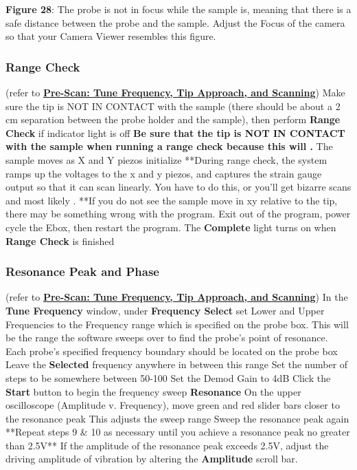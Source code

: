 \documentclass{../lab}
\begin{document}
\textbf{Figure 28}:  The probe is not in focus while the sample is, meaning that there is a safe distance between the probe and the sample.  Adjust the Focus of the camera so that your Camera Viewer resembles this figure.

\subsubsection{Range Check}
\label{subsubsec:RangeCheck}

(refer to \href{http://experimentationlab.berkeley.edu/sites/default/files/prescan\_final2.mp4}{\textbf{Pre-Scan: Tune Frequency, Tip Approach, and Scanning}})
Make sure the tip is NOT IN CONTACT with the sample (there should be about a 2 cm separation between the probe holder and the sample), then perform \textbf{Range Check} if indicator light is off
\textbf{Be sure that the tip is NOT IN CONTACT with the sample when running a range check because this will .}
The sample moves as X and Y piezos initialize
**During range check, the system ramps up the voltages to the x and y piezos, and captures the strain gauge output so that it can scan linearly. You have to do this, or you'll get bizarre scans and most likely .
**If you do not see the sample move in xy relative to the tip, there may be something wrong with the program.  Exit out of the program, power cycle the Ebox, then restart the program.
The \textbf{Complete} light turns on when \textbf{Range Check} is finished


\subsubsection{Resonance Peak and Phase} (refer to \href{http://experimentationlab.berkeley.edu/sites/default/files/prescan\_final2.mp4}{\textbf{Pre-Scan: Tune Frequency, Tip Approach, and Scanning}})
In the \textbf{Tune Frequency }window, under \textbf{Frequency Select} set Lower and Upper Frequencies to the Frequency range which is specified on the probe box.  This will be the range the software sweeps over to find the probe's point of resonance.
Each probe’s specified frequency boundary should be located on the probe box
Leave the \textbf{Selected }frequency anywhere in between this range
Set the number of steps to be somewhere between 50-100
Set the Demod Gain to 4dB
Click the \textbf{Start} button to begin the frequency sweep
\textbf{Resonance}
On the upper oscilloscope (Amplitude v. Frequency), move green and red slider bars closer to the resonance peak
This adjusts the sweep range
Sweep the resonance peak again
**Repeat steps 9 \& 10 as necessary until you achieve a resonance peak no greater than 2.5V**
If the amplitude of the resonance peak exceeds 2.5V, adjust the driving amplitude of vibration by altering the \textbf{Amplitude} scroll bar.
\end{document}
